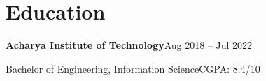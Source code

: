 \section{Education}
\textbf{Acharya Institute of Technology}\hfill Aug 2018 -- Jul 2022\par
Bachelor of Engineering, Information Science\hfill CGPA: 8.4/10\par
